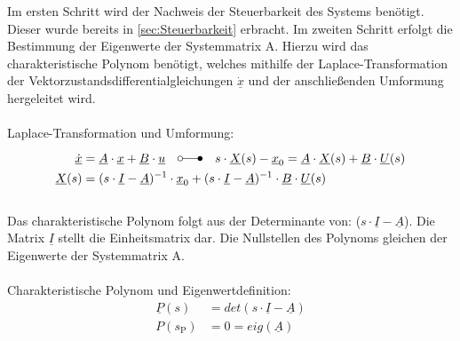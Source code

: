 \documentclass[
	pagesize,
	fontsize=12pt,
	paper=a4,
	oneside,
   reqno
]{scrartcl}
\begin{document}
Im ersten Schritt wird der Nachweis der Steuerbarkeit des Systems benötigt. Dieser wurde bereits in \autoref{sec:Steuerbarkeit} erbracht.
Im zweiten Schritt erfolgt die Bestimmung der Eigenwerte der Systemmatrix A. Hierzu wird das charakteristische Polynom benötigt, welches mithilfe der Laplace-Transformation der Vektorzustandsdifferentialgleichungen $\underline{\dot{x}}$ und der anschließenden Umformung hergeleitet wird.\\\\
Laplace-Transformation und Umformung:
\begin{align*}
    \underline{\dot{x}} &= \underline{A}\cdot\underline{x}+\underline{B}\cdot\underline{u}\quad\laplace \quad s\cdot \underline{X}(s)-\underline{x}_{\mathrm{0}}=\underline{A}\cdot \underline{X}(s)+\underline{B}\cdot \underline{U}(s) \\
    \underline{X}(s) &= (s\cdot \underline{I} - \underline{A})^{-1}\cdot\underline{x}_{\mathrm{0}}+(s\cdot \underline{I} - \underline{A})^{-1}\cdot\underline{B}\cdot\underline{U}(s)
\end{align*}\\
Das charakteristische Polynom folgt aus der Determinante von: ($s\cdot\underline{I}-\underline{A}$). Die Matrix $\underline{I}$ stellt die Einheitsmatrix dar. Die Nullstellen des Polynoms gleichen der Eigenwerte der Systemmatrix A.\\\\
Charakteristische Polynom und Eigenwertdefinition:
\begin{align*}
    \underline{P}(s) &= det(s\cdot\underline{I}-\underline{A}) \\
    P(s_{\mathrm{P}}) &= 0 = eig(\underline{A})
\end{align*}
\end{document}
